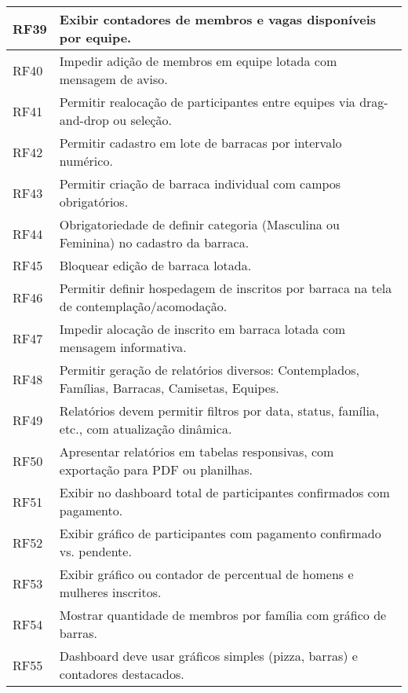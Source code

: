 \begin{longtable}{|p{4cm}|>{\raggedright\arraybackslash}p{\dimexpr\linewidth-4.2cm}|}
\hline
RF39 & Exibir contadores de membros e vagas disponíveis por equipe. \\
\hline
RF40 & Impedir adição de membros em equipe lotada com mensagem de aviso. \\
\hline
RF41 & Permitir realocação de participantes entre equipes via drag-and-drop ou seleção. \\
\hline
RF42 & Permitir cadastro em lote de barracas por intervalo numérico. \\
\hline
RF43 & Permitir criação de barraca individual com campos obrigatórios. \\
\hline
RF44 & Obrigatoriedade de definir categoria (Masculina ou Feminina) no cadastro da barraca. \\
\hline
RF45 & Bloquear edição de barraca lotada. \\
\hline
RF46 & Permitir definir hospedagem de inscritos por barraca na tela de contemplação/acomodação. \\
\hline
RF47 & Impedir alocação de inscrito em barraca lotada com mensagem informativa. \\
\hline
RF48 & Permitir geração de relatórios diversos: Contemplados, Famílias, Barracas, Camisetas, Equipes. \\
\hline
RF49 & Relatórios devem permitir filtros por data, status, família, etc., com atualização dinâmica. \\
\hline
RF50 & Apresentar relatórios em tabelas responsivas, com exportação para PDF ou planilhas. \\
\hline
RF51 & Exibir no dashboard total de participantes confirmados com pagamento. \\
\hline
RF52 & Exibir gráfico de participantes com pagamento confirmado vs. pendente. \\
\hline
RF53 & Exibir gráfico ou contador de percentual de homens e mulheres inscritos. \\
\hline
RF54 & Mostrar quantidade de membros por família com gráfico de barras. \\
\hline
RF55 & Dashboard deve usar gráficos simples (pizza, barras) e contadores destacados. \\
\hline
\end{longtable}

